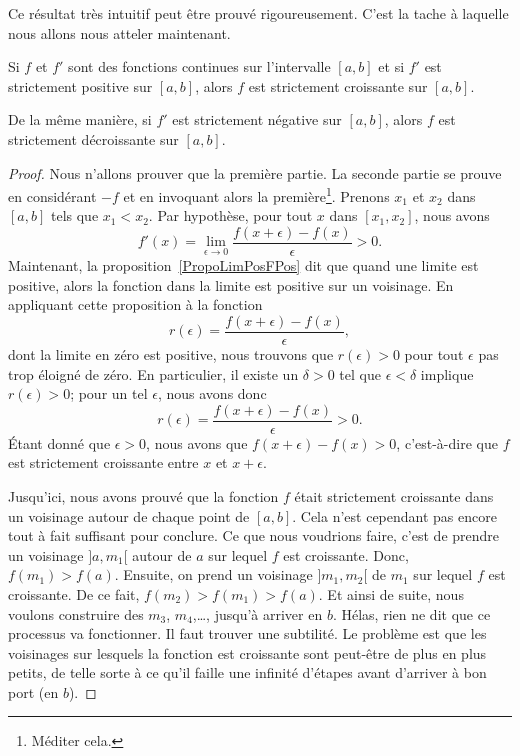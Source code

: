Ce résultat très intuitif peut être prouvé rigoureusement. C'est la tache à laquelle nous allons nous atteler maintenant.

\begin{proposition} \label{PropGFkZMwD}
	Si \( f\) et \( f'\) sont des fonctions continues sur l'intervalle \( [a,b]\) et si \( f'\) est strictement positive sur \( [a,b]\), alors \( f\) est strictement croissante sur \( [a,b]\).

	De la même manière, si \( f'\) est strictement négative sur \( [a,b]\), alors \( f\) est strictement décroissante sur \( [a,b]\).
\end{proposition}

\begin{proof}
	Nous n'allons prouver que la première partie. La seconde partie se prouve en considérant \( -f\) et en invoquant alors la première\footnote{Méditer cela.}. Prenons \( x_1\) et \( x_2\) dans \( [a,b]\) tels que \( x_1<x_2\). Par hypothèse, pour tout \( x\) dans \( [x_1,x_2]\), nous avons
	\begin{equation}
		f'(x)=\lim_{\epsilon\to 0}\frac{ f(x+\epsilon)-f(x) }{\epsilon} >0.
	\end{equation}
	Maintenant, la proposition~\ref{PropoLimPosFPos} dit que quand une limite est positive, alors la fonction dans la limite est positive sur un voisinage. En appliquant cette proposition à la fonction
	\begin{equation}
		r(\epsilon)=\frac{ f(x+\epsilon)-f(x) }{ \epsilon },
	\end{equation}
	dont la limite en zéro est positive, nous trouvons que \( r(\epsilon)>0\) pour tout \( \epsilon\) pas trop éloigné de zéro. En particulier, il existe un \( \delta>0\) tel que \( \epsilon<\delta\) implique \( r(\epsilon)>0\); pour un tel \( \epsilon\), nous avons donc
	\begin{equation}
		r(\epsilon)=\frac{ f(x+\epsilon)-f(x) }{ \epsilon }>0.
	\end{equation}
	Étant donné que \( \epsilon>0\), nous avons que \( f(x+\epsilon)-f(x)>0\), c'est-à-dire que \( f\) est strictement croissante entre \( x\) et \( x+\epsilon\).

	Jusqu'ici, nous avons prouvé que la fonction \( f\) était strictement croissante dans un voisinage autour de chaque point de \( [a,b]\). Cela n'est cependant pas encore tout à fait suffisant pour conclure. Ce que nous voudrions faire, c'est de prendre un voisinage \( ]a,m_1[\) autour de \( a\) sur lequel \( f\) est croissante. Donc, \( f(m_1)>f(a)\). Ensuite, on prend un voisinage \( ]m_1,m_2[\) de \( m_1\) sur lequel \( f\) est croissante. De ce fait, \( f(m_2)>f(m_1)>f(a)\). Et ainsi de suite, nous voulons construire des \( m_3\), \( m_4\),\ldots, jusqu'à arriver en \( b\). Hélas, rien ne dit que ce processus va fonctionner. Il faut trouver une subtilité. Le problème est que les voisinages sur lesquels la fonction est croissante sont peut-être de plus en plus petits, de telle sorte à ce qu'il faille une infinité d'étapes avant d'arriver à bon port (en \( b\)).


\end{proof}
